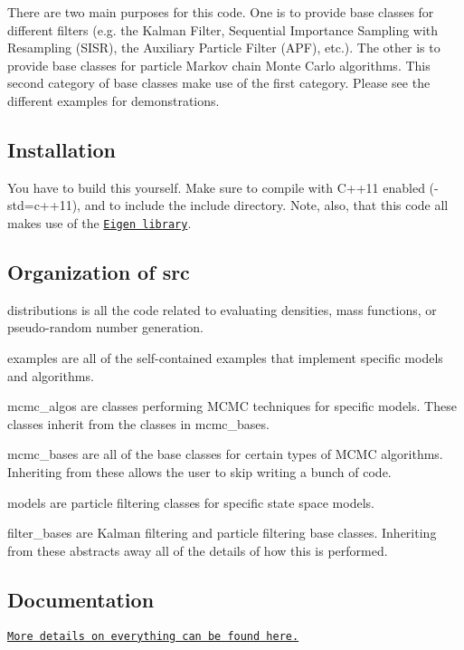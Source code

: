 There are two main purposes for this code. One is to provide base classes for different filters (e.\+g. the Kalman Filter, Sequential Importance Sampling with Resampling (S\+I\+SR), the Auxiliary Particle Filter (A\+PF), etc.). The other is to provide base classes for particle Markov chain Monte Carlo algorithms. This second category of base classes make use of the first category. Please see the different examples for demonstrations.

\subsection*{Installation}

You have to build this yourself. Make sure to compile with C++11 enabled ({\ttfamily -\/std=c++11}), and to include the {\ttfamily include} directory. Note, also, that this code all makes use of the \href{http://eigen.tuxfamily.org/}{\tt Eigen library}.

\subsection*{Organization of {\ttfamily src}}


\begin{DoxyEnumerate}
\item {\ttfamily distributions} is all the code related to evaluating densities, mass functions, or pseudo-\/random number generation.
\item {\ttfamily examples} are all of the self-\/contained examples that implement specific models and algorithms.
\item {\ttfamily mcmc\+\_\+algos} are classes performing M\+C\+MC techniques for specific models. These classes inherit from the classes in {\ttfamily mcmc\+\_\+bases}.
\item {\ttfamily mcmc\+\_\+bases} are all of the base classes for certain types of M\+C\+MC algorithms. Inheriting from these allows the user to skip writing a bunch of code.
\item {\ttfamily models} are particle filtering classes for specific state space models.
\item {\ttfamily filter\+\_\+bases} are Kalman filtering and particle filtering base classes. Inheriting from these abstracts away all of the details of how this is performed.
\end{DoxyEnumerate}

\subsection*{Documentation}

\href{https://tbrown122387.github.io/ssm/}{\tt More details on everything can be found here.} 